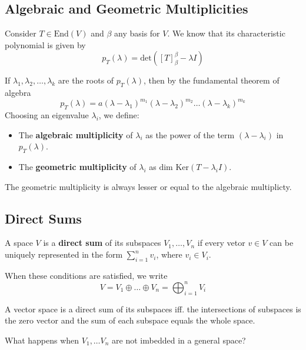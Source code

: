 \subsection{Algebraic and Geometric Multiplicities}

\begin{definition}
	Consider $T \in \text{End}(V)$ and $\beta$ any basis for $V$. We know that its characteristic polynomial is given by
	\[ p_T(\lambda) = \text{det}([T]_\beta^{\beta} - \lambda I) \]

	If $\lambda_1, \lambda_2, \ldots, \lambda_k$ are the roots of $p_T(\lambda)$, then by the fundamental theorem of algebra
	\[
		p_T(\lambda) = a(\lambda - \lambda_1)^{m_1} (\lambda - \lambda_2)^{m_2} \ldots (\lambda - \lambda_k)^{m_k}
	\]
	Choosing an eigenvalue $\lambda_i$, we define:
	\begin{itemize}
		\item The \textbf{algebraic multiplicity} of $\lambda_i$ as the power of the term $(\lambda - \lambda_i)$ in $p_T(\lambda)$.
		\item The \textbf{geometric multiplicity} of $\lambda_i$ as $\text{dim Ker}(T - \lambda_i I)$.
	\end{itemize}
\end{definition}

\begin{remark}
	The geometric multiplicity is always lesser or equal to the algebraic multiplicty.
\end{remark}

\subsection{Direct Sums}

\begin{definition}
	A space $V$ is a \textbf{direct sum} of its subspaces $V_1, \ldots, V_n$ if every vetor $v \in V$ can be uniquely represented in the form $\sum_{i=1}^n v_i$, where $v_i \in V_i$.

	When these conditions are satisfied, we write
	\[
		V = V_1 \oplus \ldots \oplus V_n = \bigoplus_{i=1}^n V_i
	\]
\end{definition}

A vector space is a direct sum of its subspaces iff. the intersections of subspaces is the zero vector and the sum of each subspace equals the whole space.

What happens when $V_1, \ldots V_n$ are not imbedded in a general space? 

